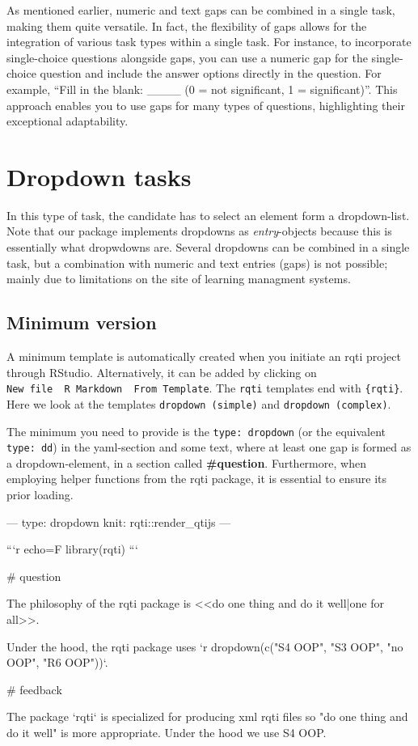 \documentclass[twoside]{tufte-book}
\newenvironment{Shaded}{}{}
\begin{document}
As mentioned earlier, numeric and text gaps can be combined in a single task, making them quite versatile. In fact, the flexibility of gaps allows for the integration of various task types within a single task. For instance, to incorporate single-choice questions alongside gaps, you can use a numeric gap for the single-choice question and include the answer options directly in the question. For example, ``Fill in the blank: \_\_\_\_ (0 = not significant, 1 = significant)''. This approach enables you to use gaps for many types of questions, highlighting their exceptional adaptability.

\chapter{Dropdown tasks}\label{dropdown-tasks}

In this type of task, the candidate has to select an element form a dropdown-list. Note that our package implements dropdowns as \emph{entry}-objects because this is essentially what dropwdowns are. Several dropdowns can be combined in a single task, but a combination with numeric and text entries (gaps) is not possible; mainly due to limitations on the site of learning managment systems.

\section{Minimum version}\label{minimum-version-3}

A minimum template is automatically created when you initiate an rqti project through RStudio. Alternatively, it can be added by clicking on \texttt{New\ file\ \textrightarrow{}\ R\ Markdown\ \textrightarrow{}\ From\ Template}. The \texttt{rqti} templates end with \texttt{\{rqti\}}. Here we look at the templates \texttt{dropdown\ (simple)} and \texttt{dropdown\ (complex)}.

The minimum you need to provide is the \texttt{type:\ dropdown} (or the equivalent \texttt{type:\ dd}) in the yaml-section and some text, where at least one gap is formed as a dropdown-element, in a section called \textbf{\#question}. Furthermore, when employing helper functions from the rqti package, it is essential to ensure its prior loading.

\begin{Shaded}
\begin{Highlighting}
---
type: dropdown
knit: rqti::render_qtijs
---

```{r echo=F}
library(rqti)
```

# question

The philosophy of the rqti package is <<do one thing and do it well|one for
all>>.

Under the hood, the rqti package uses `r dropdown(c("S4 OOP", "S3 OOP", "no
OOP", "R6 OOP"))`.

# feedback

The package `rqti` is specialized for producing xml rqti files so "do one thing
and do it well" is more appropriate. Under the hood we use S4 OOP.
\end{Highlighting}
\end{Shaded}
\end{document}
